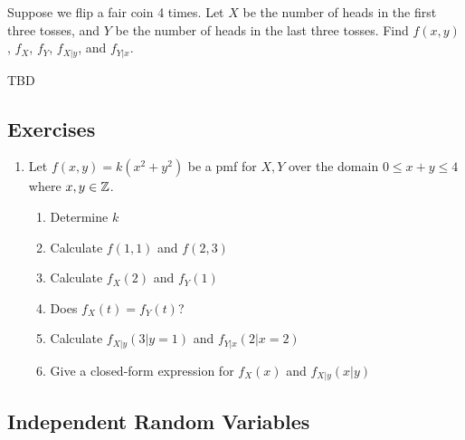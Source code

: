 \documentclass[../main.tex]{subfiles}
\begin{document}
\begin{example}
Suppose we flip a fair coin 4 times. Let $X$ be the number of heads in the first three tosses, and $Y$ be the number of heads in the last three tosses. Find $f(x,y)$, $f_X$, $f_Y$, $f_{X|y}$, and $f_{Y|x}$. 
\end{example}
\begin{solution}
	TBD
\end{solution}

\subsection{Exercises}
\begin{enumerate}
	\item Let $f(x,y) = k(x^2+y^2)$ be a pmf for $X,Y$ over the domain $0 \leq x + y \leq 4$
	where $x,y \in \mathbb{Z}$.
	\begin{enumerate}
		\item Determine $k$
		\item Calculate $f(1,1)$ and $f(2,3)$
		\item Calculate $f_X(2)$ and $f_Y(1)$
		\item Does $f_X(t) = f_Y(t)$?
		\item Calculate $f_{X|y}(3|y=1)$ and $f_{Y|x}(2|x=2)$
		\item Give a closed-form expression for $f_X(x)$ and $f_{X|y}(x|y)$
	\end{enumerate}
\end{enumerate}
\subsection{Independent Random Variables}
\end{document}

